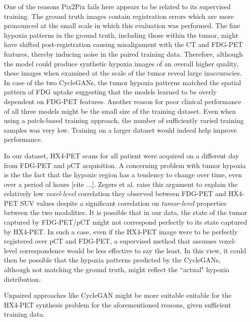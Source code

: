 One of the reasons Pix2Pix fails here appears to be related to its supervised training. The ground truth images contain registration errors which are more pronounced at the small scale in which this evaluation was performed. The fine hypoxia patterns in the ground truth, including those within the tumor, might have shifted post-registration causing misalignment with the CT and FDG-PET features, thereby inducing noise in the paired training data. Therefore, although the model could produce synthetic hypoxia images of an overall higher quality, these images when examined at the scale of the tumor reveal large inaccuracies.
In case of the two CycleGANs, the tumor hypoxia patterns matched the spatial pattern of FDG uptake suggesting that the models learned to be overly dependent on FDG-PET features.
Another reason for poor clinical performance of all three models might be the small size of the training dataset. Even when using a patch-based training approach, the number of sufficiently varied training samples was very low. Training on a larger dataset would indeed help improve performance.

In our dataset, HX4-PET scans for all patient were acquired on a different day from FDG-PET and pCT acquisition. A concerning problem with tumor hypoxia is the the fact that the hypoxic region has a tendency to change over time, even over a period of hours [cite ...]. Zegers et al. \cite{zegers2013hypoxia} raise this argument to explain the relatively low \textit{voxel-level} correlation they observed between FDG-PET and HX4-PET SUV values despite a significant correlation on \textit{tumor-level} properties between the two modalities. It is possible that in our data, the state of the tumor captured by FDG-PET/pCT might not correspond perfectly to its state captured by HX4-PET. In such a case, even if the HX4-PET image were to be perfectly registered over pCT and FDG-PET, a supervised method that assumes voxel-level correspondence would be less effective to say the least. In this view, it could then be possible that the hypoxia patterns predicted by the CycleGANs, although not matching the ground truth, might reflect the ``actual" hypoxia distribution.

Unpaired approaches like CycleGAN might be more suitable suitable for the HX4-PET synthesis problem for the aforementioned reasons, given sufficient training data.